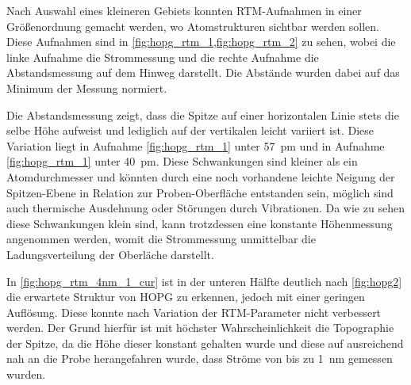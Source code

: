 Nach Auswahl eines kleineren Gebiets konnten RTM-Aufnahmen in einer Größenordnung gemacht werden, wo 
Atomstrukturen sichtbar werden sollen. Diese Aufnahmen sind in \cref{fig:hopg_rtm_1,fig:hopg_rtm_2} zu sehen, wobei 
die linke Aufnahme die Strommessung und die rechte Aufnahme die Abstandsmessung auf dem Hinweg darstellt.
Die Abstände wurden dabei auf das Minimum der Messung normiert.\par
Die Abstandsmessung zeigt, dass die 
Spitze auf einer horizontalen Linie stets die selbe Höhe aufweist und lediglich auf der vertikalen leicht variiert ist.
Diese Variation liegt in Aufnahme \ref{fig:hopg_rtm_1} unter \SI{57}{\pm} und in Aufnahme \ref{fig:hopg_rtm_1}
unter \SI{40}{\pm}. Diese Schwankungen sind kleiner als ein Atomdurchmesser und könnten durch eine noch 
vorhandene leichte Neigung der Spitzen-Ebene in Relation zur Proben-Oberfläche entstanden sein, möglich sind auch 
thermische Ausdehnung oder Störungen durch Vibrationen. Da wie zu sehen diese Schwankungen klein sind, kann 
trotzdessen eine konstante Höhenmessung angenommen werden, womit die Strommessung unmittelbar die 
Ladungsverteilung der Oberläche darstellt.




In \cref{fig:hopg_rtm_4nm_1_cur} ist in der unteren Hälfte deutlich nach \cref{fig:hopg2} die erwartete Struktur 
von HOPG zu erkennen, jedoch mit einer geringen Auflösung. Diese konnte nach Variation der 
RTM-Parameter nicht verbessert werden. Der Grund hierfür ist mit höchster Wahrscheinlichkeit die Topographie 
der Spitze, da die Höhe dieser konstant gehalten wurde und diese auf ausreichend nah an die Probe 
herangefahren wurde, dass Ströme von bis zu \SI{1}{\nm} gemessen wurden.




